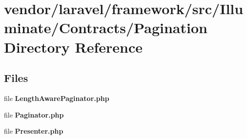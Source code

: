 \section{vendor/laravel/framework/src/\+Illuminate/\+Contracts/\+Pagination Directory Reference}
\label{dir_d17c96c2c03f1f1ec2513d01402fb7fa}
\subsection*{Files}
\begin{DoxyCompactItemize}
\item 
file {\bf Length\+Aware\+Paginator.\+php}
\item 
file {\bf Paginator.\+php}
\item 
file {\bf Presenter.\+php}
\end{DoxyCompactItemize}
